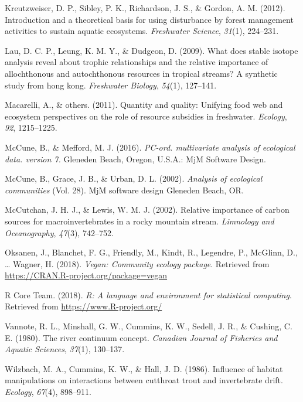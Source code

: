 \documentclass[double,12pt]{beavtex}
\begin{document}
  \hypertarget{ref-Kreutzweiser2012}{}
  Kreutzweiser, D. P., Sibley, P. K., Richardson, J. S., \& Gordon, A. M.
  (2012). Introduction and a theoretical basis for using disturbance by
  forest management activities to sustain aquatic ecosystems.
  \emph{Freshwater Science}, \emph{31}(1), 224--231.
  
  \hypertarget{ref-Lau2009}{}
  Lau, D. C. P., Leung, K. M. Y., \& Dudgeon, D. (2009). What does stable
  isotope analysis reveal about trophic relationships and the relative
  importance of allochthonous and autochthonous resources in tropical
  streams? A synthetic study from hong kong. \emph{Freshwater Biology},
  \emph{54}(1), 127--141.
  
  \hypertarget{ref-Macarelli2011}{}
  Macarelli, A., \& others. (2011). Quantity and quality: Unifying food
  web and ecosystem perspectives on the role of resource subsidies in
  freshwater. \emph{Ecology}, \emph{92}, 1215--1225.
  
  \hypertarget{ref-PC-ORD}{}
  McCune, B., \& Mefford, M. J. (2016). \emph{PC-ord. multivariate
  analysis of ecological data. version 7.} Gleneden Beach, Oregon, U.S.A.:
  MjM Software Design.
  
  \hypertarget{ref-McCune2002}{}
  McCune, B., Grace, J. B., \& Urban, D. L. (2002). \emph{Analysis of
  ecological communities} (Vol. 28). MjM software design Gleneden Beach,
  OR.
  
  \hypertarget{ref-McCutchan2002}{}
  McCutchan, J. H. J., \& Lewis, W. M. J. (2002). Relative importance of
  carbon sources for macroinvertebrates in a rocky mountain stream.
  \emph{Limnology and Oceanography}, \emph{47}(3), 742--752.
  
  \hypertarget{ref-vegan}{}
  Oksanen, J., Blanchet, F. G., Friendly, M., Kindt, R., Legendre, P.,
  McGlinn, D., \ldots{} Wagner, H. (2018). \emph{Vegan: Community ecology
  package}. Retrieved from \url{https://CRAN.R-project.org/package=vegan}
  
  \hypertarget{ref-R-base}{}
  R Core Team. (2018). \emph{R: A language and environment for statistical
  computing}. Retrieved from \url{https://www.R-project.org/}
  
  \hypertarget{ref-Vannote1980}{}
  Vannote, R. L., Minshall, G. W., Cummins, K. W., Sedell, J. R., \&
  Cushing, C. E. (1980). The river continuum concept. \emph{Canadian
  Journal of Fisheries and Aquatic Sciences}, \emph{37}(1), 130--137.
  
  \hypertarget{ref-Wilzbach1986}{}
  Wilzbach, M. A., Cummins, K. W., \& Hall, J. D. (1986). Influence of
  habitat manipulations on interactions between cutthroat trout and
  invertebrate drift. \emph{Ecology}, \emph{67}(4), 898--911.
\end{document}
